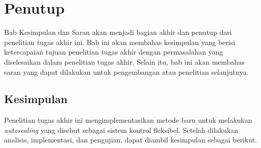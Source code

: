 \chapter{Penutup}

Bab Kesimpulan dan Saran akan menjadi bagian akhir dan penutup dari penelitian tugas akhir ini. Bab ini akan membahas kesimpulan yang berisi ketercapaian tujuan penelitian tugas akhir dengan permasalahan yang diselesaikan dalam penelitian tugas akhir. Selain itu, bab ini akan membahas saran yang dapat dilakukan untuk pengembangan atau penelitian selanjutnya.

\section{Kesimpulan}
Penelitian tugas akhir ini mengimplementasikan metode baru untuk melakukan \textit{autoscaling} yang disebut sebagai sistem kontrol fleksibel. Setelah dilakukan analisis, implementasi, dan pengujian, dapat diambil kesimpulan sebagai berikut.
